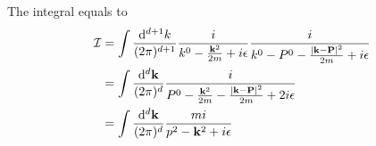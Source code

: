 \documentclass{article}
\newcommand{\mmd}[2][d]{\frac{\dd^{#1}{#2}}{(2\pi)^{#1}}}
\begin{document}
    The integral equals to 
    \begin{align}
        \mathcal{I}&=\int\mmd[d+1]{k}\frac{i}{k^0-\frac{\vb{k}^2}{2m}+i\epsilon}\frac{i}{k^0-P^0-\frac{\abs{\vb{k-P}}^2}{2m}+i\epsilon}\\
        &=\int\mmd[d]{\vb{k}}\frac{i}{P^0-\frac{\vb{k}^2}{2m}-\frac{\abs{\vb{k-P}}^2}{2m}+2i\epsilon}\\
        &=\int\mmd[d]{\vb{k}}\frac{mi}{p^2-\vb{k}^2+i\epsilon}\\
    \end{align}

    
    
\end{document}
